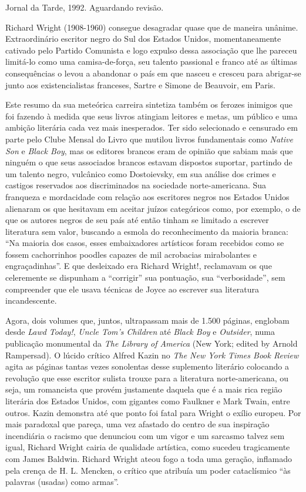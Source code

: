 \documentclass[
  letterpaper,
  DIV=11,
  numbers=noendperiod]{scrreprt}
\begin{document}
Jornal da Tarde, 1992. Aguardando revisão.

\hfill\break

Richard Wright (1908-1960) consegue desagradar quase que de maneira
unânime. Extraordinário escritor negro do Sul dos Estados Unidos,
momentaneamente cativado pelo Partido Comunista e logo expulso dessa
associação que lhe pareceu limitá-lo como uma camisa-de-força, seu
talento passional e franco até as últimas consequências o levou a
abandonar o país em que nasceu e cresceu para abrigar-se junto aos
existencialistas franceses, Sartre e Simone de Beauvoir, em Paris.

Este resumo da sua meteórica carreira sintetiza também os ferozes
inimigos que foi fazendo à medida que seus livros atingiam leitores e
metas, um público e uma ambição literária cada vez mais inesperados. Ter
sido selecionado e censurado em parte pelo Clube Mensal do Livro que
mutilou livros fundamentais como \emph{Native Son} e \emph{Black Boy},
mas os editores brancos eram de opinião que sabiam mais que ninguém o
que seus associados brancos estavam dispostos suportar, partindo de um
talento negro, vulcânico como Dostoievsky, em sua análise dos crimes e
castigos reservados aos discriminados na sociedade norte-americana. Sua
franqueza e mordacidade com relação aos escritores negros nos Estados
Unidos alienaram os que hesitavam em aceitar juízos categóricos como,
por exemplo, o de que os autores negros de seu país até então tinham se
limitado a escrever literatura sem valor, buscando a esmola do
reconhecimento da maioria branca: ``Na maioria dos casos, esses
embaixadores artísticos foram recebidos como se fossem cachorrinhos
poodles capazes de mil acrobacias mirabolantes e engraçadinhas''. E que
desleixado era Richard Wright!, reclamavam os que celeremente se
dispunham a ``corrigir'' sua pontuação, sua ``verbosidade'', sem
compreender que ele usava técnicas de Joyce ao escrever sua literatura
incandescente.

Agora, dois volumes que, juntos, ultrapassam mais de 1.500 páginas,
englobam desde \emph{Lawd Today!}, \emph{Uncle Tom's Children} até
\emph{Black Boy} e \emph{Outsider}, numa publicação monumental da
\emph{The Library of America} (New York; edited by Arnold Rampersad). O
lúcido crítico Alfred Kazin no \emph{The New York Times Book Review}
agita as páginas tantas vezes sonolentas desse suplemento literário
colocando a revolução que esse escritor sulista trouxe para a literatura
norte-americana, ou seja, um romancista que provém justamente daquela
que é a mais rica região literária dos Estados Unidos, com gigantes como
Faulkner e Mark Twain, entre outros. Kazin demonstra até que ponto foi
fatal para Wright o exílio europeu. Por mais paradoxal que pareça, uma
vez afastado do centro de sua inspiração incendiária o racismo que
denunciou com um vigor e um sarcasmo talvez sem igual, Richard Wright
cairia de qualidade artística, como sucedeu tragicamente com James
Baldwin. Richard Wright ateou fogo a toda uma geração, inflamado pela
crença de H. L. Mencken, o crítico que atribuía um poder cataclísmico
``às palavras (usadas) como armas''.
\end{document}
